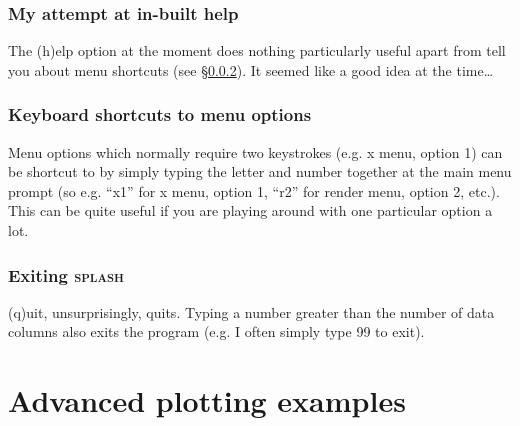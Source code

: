 \documentclass[a4paper,10pt]{article}
\newcommand{\splash}{\textsc{splash }}
\begin{document}
\subsubsection{ My attempt at in-built help}
The (h)elp option at the moment does nothing particularly useful apart from tell you about menu shortcuts (see \S\ref{sec:menushortcuts}). It seemed like a good idea at the time\ldots

\subsubsection{ Keyboard shortcuts to menu options}
\label{sec:menushortcuts}
Menu options which normally require two keystrokes (e.g. x menu, option 1) can be shortcut to by simply typing the letter and number together at the main menu prompt (so e.g. ``x1'' for x menu, option 1, ``r2'' for render menu, option 2, etc.). This can be quite useful if you are playing around with one particular option a lot.

\subsubsection{ Exiting \splash}
 (q)uit, unsurprisingly, quits. Typing a number greater than the number of
data columns also exits the program (e.g. I often simply type 99 to exit).

\section{Advanced plotting examples}%
\end{document}
